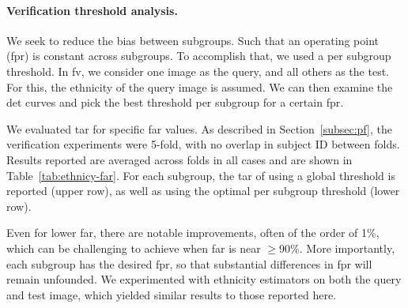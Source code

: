 \vspace{-5mm}
\noindent\paragraph{Verification threshold analysis.}%
We seek to reduce the bias between subgroups. Such that an operating point (\ie \gls{fpr}) is constant across subgroups. To accomplish that, we used a per subgroup threshold. In \gls{fv}, we consider one image as the query, and all others as the test. For this, the ethnicity of the query image is assumed. We can then examine the \gls{det} curves and pick the best threshold per subgroup for a certain \gls{fpr}.

We evaluated \gls{tar} for specific \gls{far} values. As described in Section~\ref{subsec:pf}, the verification experiments were 5-fold, with no overlap in subject ID between folds. Results reported are averaged across folds in all cases and are shown in Table~\ref{tab:ethnicy-far}. For each subgroup, the \gls{tar} of using a global threshold is reported (upper row), as well as using the optimal per subgroup threshold (lower row). 

Even for lower \gls{far}, there are notable improvements, often of the order of 1\%, which can be challenging to achieve when \gls{far} is near $\geq$90\%. More importantly, each subgroup has the desired \gls{fpr}, so that substantial differences in \gls{fpr} will remain unfounded. We experimented with ethnicity estimators on both the query and test image, which yielded similar results to those reported here.

